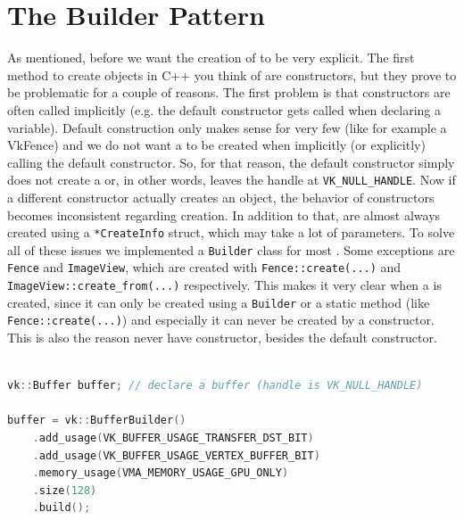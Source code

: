\section{The Builder Pattern}
As mentioned, before we want the creation of \getVkObjects{} to be very explicit. The first method to create objects in C++ you think of are constructors, but they prove to be problematic for a couple of reasons. The first problem is that constructors are often called implicitly (e.g. the default constructor gets called when declaring a variable). Default construction only makes sense for very few \getVkObjects{} (like for example a VkFence) and we do not want a \getVkObject{} to be created when implicitly (or explicitly) calling the default constructor. So, for that reason, the default constructor simply does not create a \getVkObject{} or, in other words, leaves the handle at \texttt{VK\_NULL\_HANDLE}. Now if a different constructor actually creates an object, the behavior of constructors becomes inconsistent regarding \getVkObject{} creation. In addition to that, \getVkObjects{} are almost always created using a \texttt{*CreateInfo} struct, which may take a lot of parameters. To solve all of these issues we implemented a \texttt{Builder} class for most \getVkObjects{}. Some exceptions are \texttt{Fence} and \texttt{ImageView}, which are created with \texttt{Fence::create(...)} and \texttt{ImageView::create\_from(...)} respectively. This makes it very clear when a \getVkObject{} is created, since it can only be created using a \texttt{Builder} or a static method (like \texttt{Fence::create(...)}) and especially it can never be created by a constructor. This is also the reason \getVkObjects{} never have constructor, besides the default constructor.

\begin{lstlisting}[language=C++]

vk::Buffer buffer; // declare a buffer (handle is VK_NULL_HANDLE)

buffer = vk::BufferBuilder()
    .add_usage(VK_BUFFER_USAGE_TRANSFER_DST_BIT)
    .add_usage(VK_BUFFER_USAGE_VERTEX_BUFFER_BIT)
    .memory_usage(VMA_MEMORY_USAGE_GPU_ONLY)
    .size(128)
    .build();


\end{lstlisting}
